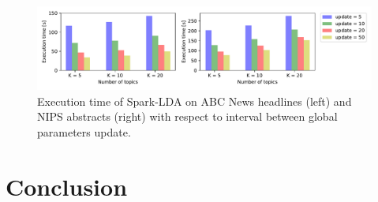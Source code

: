 \documentclass[journal]{IEEEtran}
\begin{document}
\begin{figure}[t]
\centering
\includegraphics[scale=0.7]{plots/param_update.pdf}
\caption{Execution time of Spark-LDA on ABC News headlines (left) and NIPS abstracts (right) with respect to interval between global parameters update.}
\label{fig_sim}
\end{figure}



\section{Conclusion}
\label{sec:conclusion}




\end{document}
